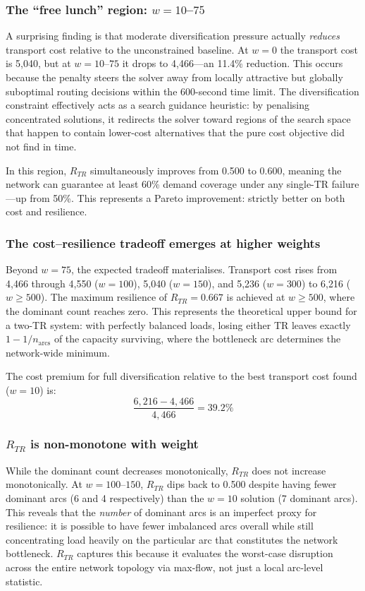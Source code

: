 \documentclass{article}
\begin{document}
\subsubsection{The ``free lunch'' region: $w = 10$--$75$}

A surprising finding is that moderate diversification pressure actually \emph{reduces} transport cost relative to the unconstrained baseline. At $w=0$ the transport cost is 5{,}040, but at $w=10$--$75$ it drops to 4{,}466---an 11.4\% reduction. This occurs because the penalty steers the solver away from locally attractive but globally suboptimal routing decisions within the 600-second time limit. The diversification constraint effectively acts as a search guidance heuristic: by penalising concentrated solutions, it redirects the solver toward regions of the search space that happen to contain lower-cost alternatives that the pure cost objective did not find in time.

In this region, $R_{TR}$ simultaneously improves from 0.500 to 0.600, meaning the network can guarantee at least 60\% demand coverage under any single-TR failure---up from 50\%. This represents a Pareto improvement: strictly better on both cost and resilience.

\subsubsection{The cost--resilience tradeoff emerges at higher weights}

Beyond $w=75$, the expected tradeoff materialises. Transport cost rises from 4{,}466 through 4{,}550 ($w=100$), 5{,}040 ($w=150$), and 5{,}236 ($w=300$) to 6{,}216 ($w \geq 500$). The maximum resilience of $R_{TR} = 0.667$ is achieved at $w \geq 500$, where the dominant count reaches zero. This represents the theoretical upper bound for a two-TR system: with perfectly balanced loads, losing either TR leaves exactly $1 - 1/n_{\text{arcs}}$ of the capacity surviving, where the bottleneck arc determines the network-wide minimum.

The cost premium for full diversification relative to the best transport cost found ($w=10$) is:
\[
    \frac{6{,}216 - 4{,}466}{4{,}466} = 39.2\%
\]

\subsubsection{$R_{TR}$ is non-monotone with weight}

While the dominant count decreases monotonically, $R_{TR}$ does not increase monotonically. At $w=100$--$150$, $R_{TR}$ dips back to 0.500 despite having fewer dominant arcs (6 and 4 respectively) than the $w=10$ solution (7 dominant arcs). This reveals that the \emph{number} of dominant arcs is an imperfect proxy for resilience: it is possible to have fewer imbalanced arcs overall while still concentrating load heavily on the particular arc that constitutes the network bottleneck. $R_{TR}$ captures this because it evaluates the worst-case disruption across the entire network topology via max-flow, not just a local arc-level statistic.
\end{document}
